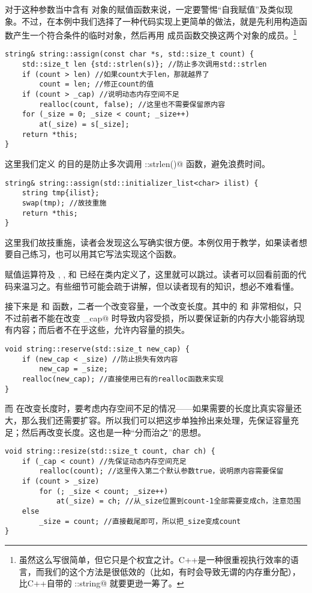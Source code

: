 对于这种参数当中含有 \lstinline@string@ 对象的赋值函数来说，一定要警惕``自我赋值''及类似现象。不过，在本例中我们选择了一种代码实现上更简单的做法，就是先利用构造函数产生一个符合条件的临时对象，然后再用 \lstinline@swap@ 成员函数交换这两个对象的成员。\footnote{虽然这么写很简单，但它只是个权宜之计。C++是一种很重视执行效率的语言，而我们的这个方法是很低效的（比如，有时会导致无谓的内存重分配），比C++自带的 \lstinline@std::string@ 就要更逊一筹了。}
\begin{lstlisting}
string& string::assign(const char *s, std::size_t count) {
    std::size_t len {std::strlen(s)}; //防止多次调用std::strlen
    if (count > len) //如果count大于len，那就越界了
        count = len; //修正count的值
    if (count > _cap) //说明动态内存空间不足
        realloc(count, false); //这里也不需要保留原内容
    for (_size = 0; _size < count; _size++)
        at(_size) = s[_size];
    return *this;
}
\end{lstlisting}
这里我们定义 \lstinline@len@ 的目的是防止多次调用 \lstinline@std::strlen()@ 函数，避免浪费时间。
\begin{lstlisting}
string& string::assign(std::initializer_list<char> ilist) {
    string tmp{ilist};
    swap(tmp); //故技重施
    return *this;
}
\end{lstlisting}
这里我们故技重施，读者会发现这么写确实很方便。本例仅用于教学，如果读者想要自己练习，也可以用其它写法实现这个函数。\par
赋值运算符及 \lstinline@empty@, \lstinline@size@, \lstinline@length@ 和 \lstinline@capacity@ 已经在类内定义了，这里就可以跳过。读者可以回看前面的代码来温习之。有些细节可能会疏于讲解，但以读者现有的知识，想必不难看懂。\par
接下来是 \lstinline@reserve@ 和 \lstinline@resize@ 函数，二者一个改变容量，一个改变长度。其中的 \lstinline@reserve@ 和 \lstinline@realloc@ 非常相似，只不过前者不能在改变 \lstinline@_cap@ 时导致内容受损，所以要保证新的内存大小能容纳现有内容；而后者不在乎这些，允许内容量的损失。
\begin{lstlisting}
void string::reserve(std::size_t new_cap) {
    if (new_cap < _size) //防止损失有效内容
        new_cap = _size;
    realloc(new_cap); //直接使用已有的realloc函数来实现
}
\end{lstlisting}
而 \lstinline@resize@ 在改变长度时，要考虑内存空间不足的情况——如果需要的长度比真实容量还大，那么我们还需要扩容。所以我们可以把这步单独拎出来处理，先保证容量充足；然后再改变长度。这也是一种``分而治之''的思想。
\begin{lstlisting}
void string::resize(std::size_t count, char ch) {
    if (_cap < count) //先保证动态内存空间充足
        realloc(count); //这里传入第二个默认参数true，说明原内容需要保留
    if (count > _size)
        for (; _size < count; _size++)
            at(_size) = ch; //从_size位置到count-1全部需要变成ch，注意范围
    else
        _size = count; //直接截尾即可，所以把_size变成count
}
\end{lstlisting}
